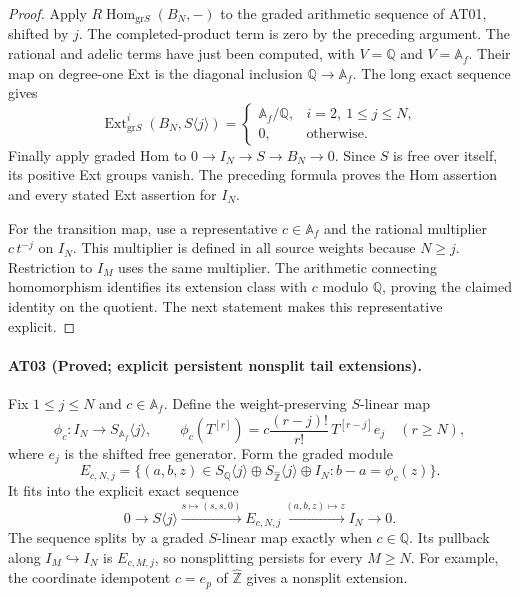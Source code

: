 \begin{proof}
Apply $R\operatorname{Hom}_{\mathrm{gr}S}(B_N,-)$ to the
graded arithmetic sequence of AT01, shifted by $j$.
The completed-product term is zero by the preceding
argument. The rational and adelic terms have just been
computed, with $V=\mathbb Q$ and $V=\mathbb A_f$.
Their map on degree-one Ext is the diagonal inclusion
$\mathbb Q\to\mathbb A_f$. The long exact sequence gives
\[
 \operatorname{Ext}^i_{\mathrm{gr}S}(B_N,S\langle j\rangle)
 =
 \begin{cases}
  \mathbb A_f/\mathbb Q,&i=2,\ 1\leq j\leq N,\\
  0,&\text{otherwise}.
 \end{cases}
\]
Finally apply graded Hom to
$0\to I_N\to S\to B_N\to0$. Since $S$ is free over
itself, its positive Ext groups vanish. The preceding
formula proves the Hom assertion and every stated Ext
assertion for $I_N$.

For the transition map, use a representative $c\in\mathbb A_f$
and the rational multiplier $c\,t^{-j}$ on $I_N$.
This multiplier is defined in all source weights because
$N\geq j$. Restriction to $I_M$ uses the same multiplier.
The arithmetic connecting homomorphism identifies its
extension class with $c$ modulo $\mathbb Q$, proving the
claimed identity on the quotient. The next statement
makes this representative explicit.
\end{proof}

\paragraph{AT03 (Proved; explicit persistent nonsplit tail extensions).}
Fix $1\leq j\leq N$ and $c\in\mathbb A_f$. Define the
weight-preserving $S$-linear map
\[
 \phi_c:I_N\longrightarrow S_{\mathbb A_f}\langle j\rangle,
 \qquad
 \phi_c(T^{[r]})=
 c\frac{(r-j)!}{r!}\,T^{[r-j]}e_j\quad(r\geq N),
\]
where $e_j$ is the shifted free generator. Form the graded
module
\[
 E_{c,N,j}=\{(a,b,z)\in
 S_{\mathbb Q}\langle j\rangle\oplus
 S_{\widehat{\mathbb Z}}\langle j\rangle\oplus I_N:
 b-a=\phi_c(z)\}.
\]
It fits into the explicit exact sequence
\[
 0\longrightarrow S\langle j\rangle
 \xrightarrow{s\mapsto(s,s,0)}E_{c,N,j}
 \xrightarrow{(a,b,z)\mapsto z}I_N\longrightarrow0.
\]
The sequence splits by a graded $S$-linear map exactly when
$c\in\mathbb Q$. Its pullback along $I_M\hookrightarrow I_N$
is $E_{c,M,j}$, so nonsplitting persists for every $M\geq N$.
For example, the coordinate idempotent $c=e_p$ of
$\widehat{\mathbb Z}$ gives a nonsplit extension.

